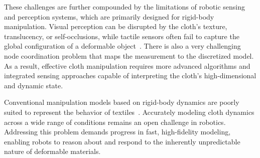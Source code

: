 These challenges are further compounded by the limitations of robotic sensing and perception systems, which are primarily designed for rigid-body manipulation. Visual perception can be disrupted by the cloth’s texture, translucency, or self-occlusions, while tactile sensors often fail to capture the global configuration of a deformable object~\cite{tirumala2022learning}. There is also a very challenging node coordination problem that maps the measurement to the discretized model. As a result, effective cloth manipulation requires more advanced algorithms and integrated sensing approaches capable of interpreting the cloth’s high-dimensional and dynamic state.

Conventional manipulation models based on rigid-body dynamics are poorly suited to represent the behavior of textiles~\cite{zheng2024differentiable}. Accurately modeling cloth dynamics across a wide range of conditions remains an open challenge in robotics. Addressing this problem demands progress in fast, high-fidelity modeling, enabling robots to reason about and respond to the inherently unpredictable nature of deformable materials.



